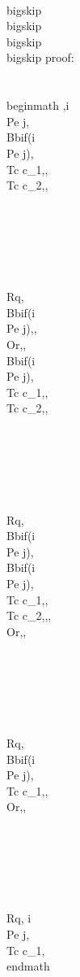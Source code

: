 \\bigskip
\\bigskip
\\bigskip
\\bigskip
proof:\\\\
\\begin{math} 
,i \\Pe j, \\Bb{if(i \\Pe j)}{,\\Tc c_1,}{,\\Tc c_2,},\\\\\\\\\\\\
\\Rq, \\Bb{if(i \\Pe j)}{,}{,\\Or,}, \\Bb{if(i \\Pe j)}{,\\Tc c_1,}{,\\Tc c_2,},\\\\\\\\\\\\
\\Rq, \\Bb{if(i \\Pe j)}{, \\Bb{if(i \\Pe j)}{,\\Tc c_1,}{,\\Tc c_2,},}{,\\Or,},  \\\\\\\\\\\\
\\Rq, \\Bb{if(i \\Pe j)}{,\\Tc c_1,}{,\\Or,}, \\\\\\\\\\\\
\\Rq, i \\Pe j, \\Tc c_1, 
\\end{math}






